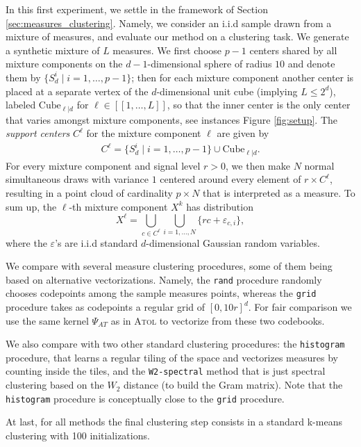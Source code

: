 \documentclass[noinfoline,preprint]{article}
\renewcommand{\1}{\mathds 1}
\begin{document}
In this first experiment, we settle in the framework of Section \ref{sec:measures_clustering}. Namely, we consider an i.i.d sample drawn from a mixture of measures, and evaluate our method on a clustering task. 
We generate a synthetic mixture of $L$ measures. We first choose $p-1$ centers shared by all mixture components on the $d-1$-dimensional sphere of radius $10$ and denote them by $\{S_d^{i} \mid i=1, \hdots, p-1\}$; then for each mixture component another center is placed at a separate vertex of the $d$-dimensional unit cube (implying $L \leqslant 2^d$), labeled $\text{Cube}_{\ell|d}$ for $\ell\in [\![1, \hdots, L]\!]$, so that the inner center is the only center that varies amongst mixture components, see instances Figure \ref{fig:setup}. The \textit{support centers} $C^\ell$ for the mixture component $\ell$ are given by
\begin{align}
C^\ell = \{ S_d^{i} \mid i=1, \hdots, p-1\} \cup \text{Cube}_{\ell|d}.
\end{align}
For every mixture component and signal level $r>0$, we then make $N$ normal simultaneous draws with variance $1$ centered around every element of  $r \times C^\ell$, resulting in a point cloud of cardinality $p \times N$ that is interpreted as a measure. To sum up, the $\ell$-th mixture component $X^k$ has distribution
\[
X^\ell = \bigcup_{c \in C^\ell} \bigcup_{i=1, \hdots, N} \{ rc + \varepsilon_{c,i} \}, 
\]
where the $\varepsilon$'s are i.i.d standard $d$-dimensional Gaussian random variables. 

We compare with several measure clustering procedures, some of them being based on alternative vectorizations. Namely, the \texttt{rand} procedure randomly chooses codepoints among the sample measures points, whereas the \texttt{grid} procedure takes as codepoints a regular grid of $[0,10r]^d$. For fair comparison we use the same kernel $\Psi_{AT}$ as in \textsc{Atol} to vectorize from these two codebooks.

We also compare with two other standard clustering procedures: the \texttt{histogram} procedure, that learns a regular tiling of the space and vectorizes measures by counting inside the tiles, and the \texttt{W2-spectral} method that is just spectral clustering based on the $W_2$ distance (to build the Gram matrix). Note that the \texttt{histogram} procedure is conceptually close to the \texttt{grid} procedure.

At last, for all methods the final clustering step consists in a standard k-means clustering with 100 initializations.
\end{document}
